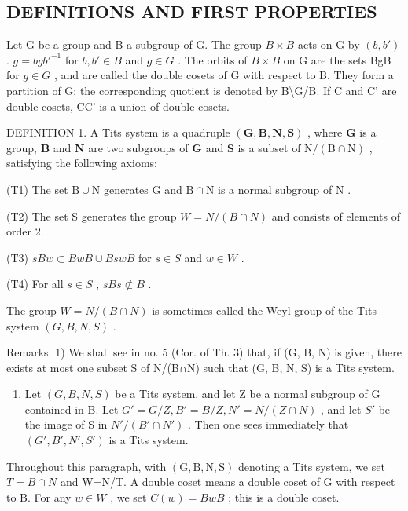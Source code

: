 \subsection{DEFINITIONS AND FIRST PROPERTIES}

Let G be a group and B a subgroup of G. The group \(B \times B\) acts on G by \((b, b')\) . \(g = bgb'^{-1}\) for \(b, b' \in B\) and \(g \in G\) . The orbits of \(B \times B\) on G are the sets BgB for \(g \in G\) , and are called the double cosets of G with respect to B. They form a partition of G; the corresponding quotient is denoted by B\textbackslash G/B. If C and C' are double cosets, CC' is a union of double cosets.

DEFINITION 1. A Tits system is a quadruple \((\mathbf{G},\mathbf{B},\mathbf{N},\mathbf{S})\) , where \(\mathbf{G}\) is a group, \(\mathbf{B}\) and \(\mathbf{N}\) are two subgroups of \(\mathbf{G}\) and \(\mathbf{S}\) is a subset of \(\mathrm{N} / (\mathrm{B}\cap \mathrm{N})\) , satisfying the following axioms:

(T1) The set \(\mathrm{B} \cup \mathrm{N}\) generates \(\mathrm{G}\) and \(\mathrm{B} \cap \mathrm{N}\) is a normal subgroup of \(\mathrm{N}\) .

(T2) The set S generates the group \(W = N/(B \cap N)\) and consists of elements of order 2.

(T3) \(sBw \subset BwB \cup BswB\) for \(s \in S\) and \(w \in W\) .

(T4) For all \(s \in S\) , \(sBs \not\subset B\) .

The group \(W = N / (B \cap N)\) is sometimes called the Weyl group of the Tits system \((G, B, N, S)\) .

Remarks. 1) We shall see in no. 5 (Cor. of Th. 3) that, if (G, B, N) is given, there exists at most one subset S of N/(B∩N) such that (G, B, N, S) is a Tits system.

\begin{enumerate}
\def\labelenumi{\arabic{enumi})}
\setcounter{enumi}{1}
\tightlist
\item
  Let \((G, B, N, S)\) be a Tits system, and let Z be a normal subgroup of G contained in B. Let \(G' = G/Z, B' = B/Z, N' = N/(Z \cap N)\) , and let \(S'\) be the image of S in \(N'/(B' \cap N')\) . Then one sees immediately that \((G', B', N', S')\) is a Tits system.
\end{enumerate}

Throughout this paragraph, with \((\mathrm{G},\mathrm{B},\mathrm{N},\mathrm{S})\) denoting a Tits system, we set \(T=B\cap N\) and W=N/T. A double coset means a double coset of G with respect to B. For any \(w\in W\) , we set \(C(w)=BwB\) ; this is a double coset.

